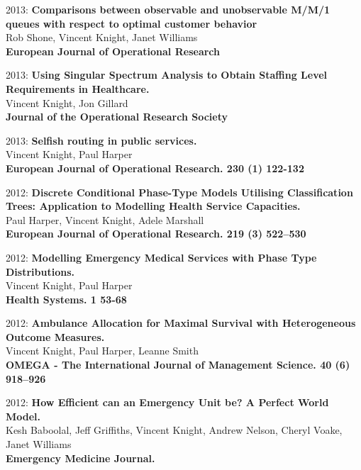 \documentclass[10pt]{res} %
\begin{document}
\begin{resume}
\begin{etaremune}
\item
2013: \textbf{Comparisons between observable and unobservable M/M/1 queues with respect to optimal customer behavior}\\
Rob Shone, Vincent Knight, Janet Williams
\\
\textbf{European Journal of Operational Research}
\\

\item
2013: \textbf{Using Singular Spectrum Analysis to Obtain Staffing Level Requirements in Healthcare.}\\
Vincent Knight, Jon Gillard
\\
\textbf{Journal of the Operational Research Society}
\\

\item
2013: \textbf{Selfish routing in public services.}\\
Vincent Knight, Paul Harper
\\
\textbf{European Journal of Operational Research. 230 (1) 122-132}
\\

\item
2012: \textbf{Discrete Conditional Phase-Type Models Utilising Classification Trees: Application to Modelling Health Service Capacities.}\\
Paul Harper, Vincent Knight, Adele Marshall
\\
\textbf{European Journal of Operational Research. 219 (3) 522--530}
\\

\item
2012: \textbf{Modelling Emergency Medical Services with Phase Type Distributions.}\\
Vincent Knight, Paul Harper
\\
\textbf{Health Systems. 1 53-68}
\\

\item
2012: \textbf{Ambulance Allocation for Maximal Survival with Heterogeneous Outcome Measures.}\\
Vincent Knight, Paul Harper, Leanne Smith
\\
\textbf{OMEGA - The International Journal of Management Science. 40 (6) 918--926}
\\

\item
2012: \textbf{How Efficient can an Emergency Unit be? A Perfect World Model.}\\
Kesh Baboolal, Jeff Griffiths, Vincent Knight, Andrew Nelson, Cheryl Voake, Janet Williams
\\
\textbf{Emergency Medicine Journal.}
\\


\end{etaremune}
\end{resume}
\end{document}
